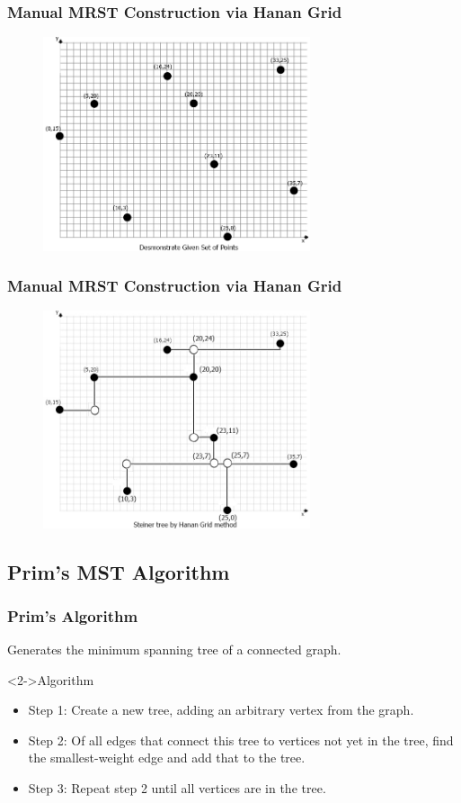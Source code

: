 \documentclass{beamer}
\begin{document}
\begin{frame}
\frametitle{Manual MRST Construction via Hanan Grid}
 \begin{figure}[Hp!]
	\includegraphics[width=0.7\textwidth]{Brennans1}
	\label{BrennansStuff1}
\end{figure}
\end{frame}

\begin{frame}
\frametitle{Manual MRST Construction via Hanan Grid}
 \begin{figure}[Hp!]
	\includegraphics[width=0.7\textwidth]{Brennans2}
	\label{BrennansStuff2}
\end{figure}
\end{frame}

\subsection{Prim's MST Algorithm}
\begin{frame}
\frametitle{Prim's Algorithm}
Generates the minimum spanning tree of a connected graph.
\begin{block}<2->{Algorithm}
\begin{itemize}
\item<2-> {
	Step 1: Create a new tree, adding an arbitrary vertex from the graph.
}
\item<3-> {
	Step 2: Of all edges that connect this tree to vertices not yet in the tree, find the 
	smallest-weight edge and add that to the tree.
}
\item<4-> {
	Step 3: Repeat step 2 until all vertices are in the tree.
}
\end{itemize}
\end{block}
\end{frame}
\end{document}
